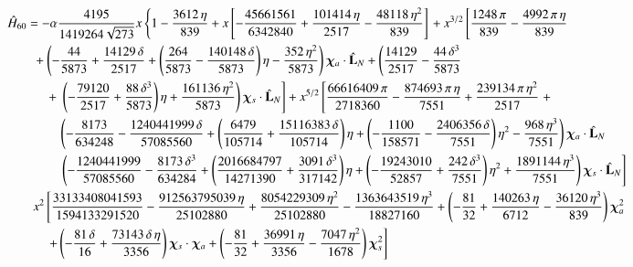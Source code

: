 \documentclass[twocolumn,showpacs,aps,prd,nobibnotes,floatfix]{revtex4-1}
\begin{document}
\begin{widetext}
\begin{subequations}
\begin{align}\label{eq:H60}
	&\hat{H}_{60} =-\alpha\frac{4195}{1419264\sqrt{273}}x\left\{1-\frac{3612\,\eta}{839}+ x\left[-\frac{45661561}{6342840} + \frac{101414\,\eta}{2517} - \frac{48118\,\eta^2}{839}\right]\right. + x^{3/2} \left[\frac{1248\,\pi}{839} -\frac{4992\,\pi\,\eta}{839}\right.\nonumber\\
	&\qquad + \left(-\frac{44}{5873} + \frac{14129\,\delta}{2517} + \left(\frac{264}{5873} - \frac{140148\,\delta}{5873}\right)\eta -\frac{352\,\eta^2}{5873}\right)\bm{\chi}_a \cdot \hat{\mathbf{L}}_N + \left(\frac{14129}{2517} -\frac{44\,\delta^3}{5873}\right.\nonumber\\
	&\quad\qquad + \left.\left.\left(-\frac{79120}{2517} + \frac{88\,\delta^3}{5873}\right)\eta + \frac{161136\,\eta^2}{5873}\right)\bm{\chi}_s \cdot \hat{\mathbf{L}}_N\right] + x^{5/2}\left[\frac{66616409\,\pi}{2718360} -\frac{874693\,\pi\,\eta}{7551} + \frac{239134\,\pi\,\eta^2}{2517}\right. + \nonumber\\
	&\qquad\qquad \left(-\frac{8173}{634248} -\frac{1240441999\,\delta}{57085560} + \left(\frac{6479}{105714} + \frac{15116383\,\delta}{105714}\right)\eta + \left(-\frac{1100}{158571}-\frac{2406356\,\delta}{7551}\right)\eta^2-\frac{968\,\eta^3}{7551}\right)\bm{\chi}_a \cdot \hat{\mathbf{L}}_N\nonumber\\
	&\qquad\qquad \left. \left(-\frac{1240441999}{57085560} -\frac{8173\,\delta^3}{634284} + \left(\frac{2016684797}{14271390} + \frac{3091\,\delta^3}{317142}\right)\eta + \left(-\frac{19243010}{52857} + \frac{242\,\delta^3}{7551}\right)\eta^2 + \frac{1891144\,\eta^3}{7551}\right)\bm{\chi}_s \cdot \hat{\mathbf{L}}_N\right]\nonumber\\
	&\qquad x^2\left[\frac{33133408041593}{1594133291520}-\frac{912563795039\,\eta}{25102880} + \frac{8054229309\,\eta^2}{25102880}-\frac{1363643519\,\eta^3}{18827160} + \left(-\frac{81}{32} + \frac{140263\,\eta}{6712}-\frac{36120\,\eta^3}{839}\right)\bm{\chi}_a^2\right. \nonumber\\
	& \quad\qquad \left.+ \left(-\frac{81\,\delta}{16} + \frac{73143\,\delta\,\eta}{3356}\right)\bm{\chi}_s \cdot \bm{\chi}_a + \left(-\frac{81}{32} + \frac{36991\,\eta}{3356} - \frac{7047\,\eta^2}{1678}\right)\bm{\chi}_s^2\right]
\end{align}


\end{subequations}
\end{widetext}
\end{document}
